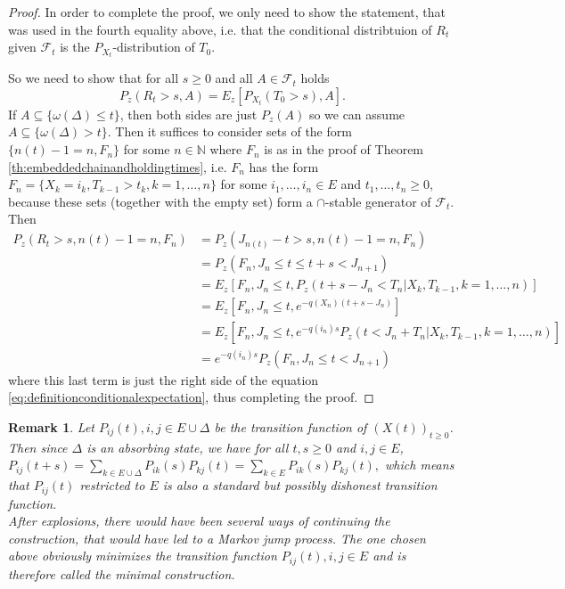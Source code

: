 \documentclass[12pt,a4paper]{scrartcl}
\newtheorem {remark}[theorem]{Remark}
\numberwithin{equation}{section}
\newcommand{\N}{\mathbb{N}} %
\begin{document}
\begin{proof}
In order to complete the proof, we only need to show the statement, that was used in the fourth equality above, i.e. that the conditional distribtuion of $R_t$ given $\mathcal{F}_t$ is the $P_{X_t}$-distribution of $T_0$.

So we need to show that for all $s \geq 0$ and all $A \in \mathcal{F}_t$ holds
\begin{equation} \label{eq:definitionconditionalexpectation}
P_z\left(R_t > s, A \right) = E_z\left[ P_{X_t}\left(T_0 > s\right) , A \right].
\end{equation}
If $A \subseteq \lbrace \omega\left(\Delta\right) \leq t \rbrace $, then both sides are just $P_z\left(A\right)$ so we can assume $A \subseteq \lbrace \omega\left(\Delta\right) > t \rbrace $. Then it suffices to consider sets of the form $\lbrace n\left(t\right) - 1 = n , F_n \rbrace$ for some $n \in \N$ where $F_n$ is as in the proof of Theorem \ref{th:embeddedchainandholdingtimes}, i.e. $F_n$ has the form $ F_n = \lbrace X_k = i_k, T_{k-1} > t_k, k=1,\ldots,n \rbrace  $ for some $i_1,\ldots,i_n \in E$ and $t_1,\ldots,t_n \geq 0 $, because these sets (together with the empty set) form a $\cap$-stable generator of $\mathcal{F}_t$. Then
\begin{align*}
P_z\left(R_t > s, n\left(t\right)-1 = n, F_n \right) &= P_z\left(J_{n\left(t\right)} - t > s, n\left(t\right) - 1 = n, F_n \right) \\
&= P_z\left(F_n, J_n \leq t \leq t + s < J_{n+1}  \right)\\
&= E_z\left[F_n, J_n \leq t, P_z\left(t+s - J_n < T_n | X_k,T_{k-1}, k=1,\ldots, n \right) \right] \\
&= E_z\left[F_n, J_n \leq t, e^{-q\left(X_n\right)\left(t+s - J_n \right)} \right] \\
&= E_z\left[F_n, J_n \leq t, e^{-q\left(i_n\right)s} P_z\left(t < J_n + T_n | X_k,T_{k-1}, k=1,\ldots, n \right) \right] \\
&= e^{-q\left(i_n\right)s} P_z\left(F_n, J_n \leq t < J_{n+1} \right)
\end{align*}
where this last term is just the right side of the equation \eqref{eq:definitionconditionalexpectation}, thus completing the proof.
\end{proof}

\begin{remark}
Let $P_{ij}\left(t\right), i,j \in E \cup \Delta$ be the transition function of $\left(X\left(t\right)\right)_{t\geq 0}$. Then since $\Delta$ is an absorbing state, we have for all $t,s \geq 0$ and $i,j \in E$, $P_{ij}\left(t+s\right) = \sum_{k \in E \cup \Delta} P_{ik}\left(s\right) P_{kj}\left(t\right) = \sum_{k \in E} P_{ik}\left(s\right) P_{kj}\left(t\right),$ which means that $P_{ij}\left(t\right)$ restricted to $E$ is also a standard but possibly dishonest transition function.\\
After explosions, there would have been several ways of continuing the construction, that would have led to a Markov jump process. The one chosen above obviously minimizes the transition function $P_{ij}\left(t\right), i,j \in E$ and is therefore called the minimal construction.
\end{remark}
\end{document}
